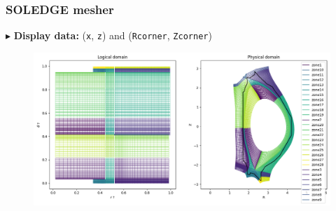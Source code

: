 \documentclass[t,10pt,a3paper]{beamer} %
\newenvironment{changemargin}[2]{%
 \begin{list}{}{%
     \setlength{\topsep}{0pt}%
     \setlength{\leftmargin}{#1}%
     \setlength{\rightmargin}{#2}%
     \setlength{\listparindent}{\parindent}%
     \setlength{\itemindent}{\parindent}%
     \setlength{\parsep}{\parskip}%
   }%
\item[]}{\end{list}}
\begin{document}
\begin{frame} %
\frametitle{\color{vert}\textbf{SOLEDGE mesher}}
\footnotesize	

{\color{vert}$\blacktriangleright$ }
\textbf{Display data:} (\verb|x|, \verb|z|) and (\verb|Rcorner|, \verb|Zcorner|)

\vspace*{0.25cm}
\begin{changemargin}{-2cm}{-2cm} 
\begin{center}
\begin{figure}[!h]
	\includegraphics[width=1.15\textwidth]{images/mesher_logical_physical_mesh.png}
\end{figure}	
\end{center}
\end{changemargin}

\end{frame}
\end{document}
